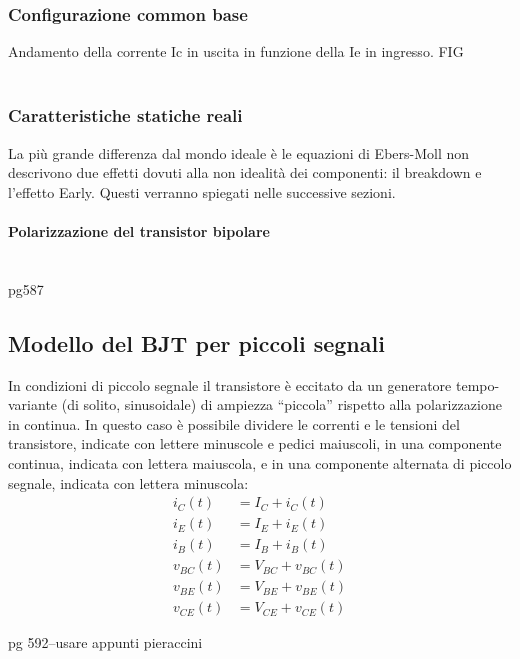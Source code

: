 \subsubsection{Configurazione common base}
Andamento della corrente Ic in uscita in funzione della Ie in ingresso.
FIG\\
\\

\subsubsection{Caratteristiche statiche reali}
La più grande differenza dal mondo ideale è le equazioni di Ebers-Moll non descrivono due effetti dovuti alla non idealità dei componenti: il breakdown e l'effetto Early. Questi verranno spiegati nelle successive sezioni.
\paragraph{Polarizzazione del transistor bipolare}\mbox{}\\
pg587
%
\cleardoublepage 

\subsection{Modello del BJT per piccoli segnali}
In condizioni di piccolo segnale il transistore è eccitato da un generatore tempo-variante (di solito, sinusoidale) di ampiezza “piccola” rispetto alla polarizzazione in continua. In questo caso è possibile dividere le correnti e le tensioni  del
transistore, indicate con lettere minuscole e pedici maiuscoli, in una componente continua, indicata con lettera maiuscola, e in una componente alternata di piccolo segnale, indicata con lettera minuscola: 
\begin{align*}
    i_C(t)&= I_C + i_C(t)\\
    i_E(t)&= I_E + i_E(t)\\
    i_B(t)&= I_B + i_B(t)\\
    v_{BC}(t)&=V_{BC} + v_{BC}(t)\\
    v_{BE}(t)&=V_{BE} + v_{BE}(t)\\
    v_{CE}(t)&=V_{CE} + v_{CE}(t)
\end{align*}

pg 592--usare appunti pieraccini

